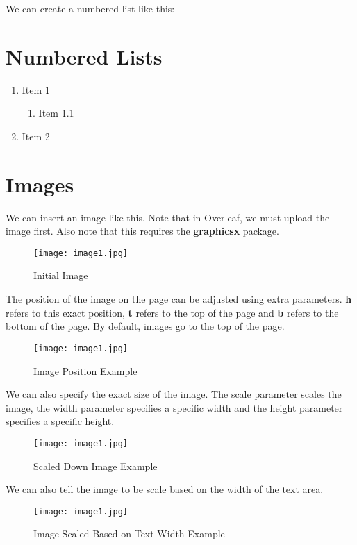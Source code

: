\documentclass[a4paper, 12pt]{article}
\begin{document}
We can create a numbered list like this:
\section{Numbered Lists}
\begin{enumerate}
    \item Item 1
    \begin{enumerate}
        \item Item 1.1
    \end{enumerate}
    \item Item 2
\end{enumerate}

\section{Images}
We can insert an image like this. Note that in Overleaf, we must upload the image first. Also note that this requires the \textbf{graphicsx} package.

\newpage

\begin{figure}
    \centering
    \texttt{[image: image1.jpg]}
    \caption{Initial Image}
\end{figure}

The position of the image on the page can be adjusted using extra parameters. \textbf{h} refers to this exact position, \textbf{t} refers to the top of the page and \textbf{b} refers to the bottom of the page. By default, images go to the top of the page.

\begin{figure}[h]
    \centering
    \texttt{[image: image1.jpg]}
    \caption{Image Position Example}
\end{figure}

We can also specify the exact size of the image. The scale parameter scales the image, the width parameter specifies a specific width and the height parameter specifies a specific height.

\begin{figure}[h]
    \centering
    \texttt{[image: image1.jpg]}
    \caption{Scaled Down Image Example}
\end{figure}

We can also tell the image to be scale based on the width of the text area.

\begin{figure}
    \centering
    \texttt{[image: image1.jpg]}
    \caption{Image Scaled Based on Text Width Example}
\end{figure}
\end{document}
